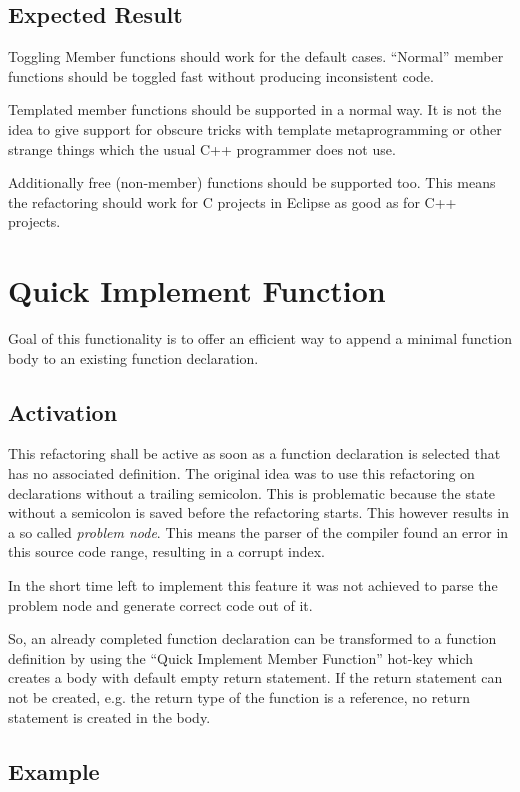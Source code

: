 \subsection{Expected Result}

Toggling Member functions should work for the default cases. ``Normal'' member
functions should be toggled fast without producing inconsistent code. 

Templated member functions should be supported in a normal way. It is not the
idea to give support for obscure tricks with template metaprogramming or other
strange things which the usual C++ programmer does not use. 

Additionally free (non-member) functions should be supported too. This means the
refactoring should work for C projects in Eclipse as good as for C++ projects.

\section{Quick Implement Function}

Goal of this functionality is to offer an efficient way to append a minimal
function body to an existing function declaration.

\subsection{Activation}
This refactoring shall be active as soon as a function declaration is selected 
that has no associated definition. The original idea was to use this
refactoring on declarations without a trailing semicolon. This is problematic
because the state without a semicolon is saved before the refactoring starts.
This however results in a so called \textit{problem node}. This means the
parser of the compiler found an error in this source code range, resulting in 
a corrupt index.

In the short time left to implement this feature it was not achieved to
parse the problem node and generate correct code out of it.

So, an already completed function declaration can be transformed to a function
definition by using the ``Quick Implement Member Function'' hot-key which
creates a body with default empty return statement. If the return statement can
not be created, e.g. the return type of the function is a reference, no return
statement is created in the body.

\subsection{Example}

